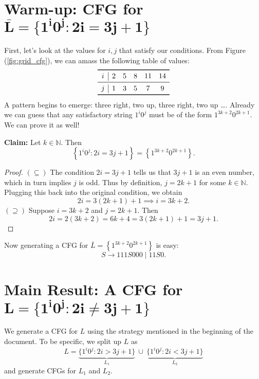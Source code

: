 \documentclass{article}
\begin{document}
\section*{Warm-up: CFG for $\bm{\bar{L}} = \bm{\{1^{i}0^{j} : 2i = 3j + 1\}}$}
    First, let's look at the values for $i, j$ that satisfy our conditions. From Figure (\ref{fig:grid_cfg}), we can amass the following table of values:
    $$\begin{array}{c|ccccc}
        \toprule
        i & 2 & 5 & 8 & 11 & 14 \\
        \midrule
        j & 1 & 3 & 5 & 7 & 9 \\
        \bottomrule
    \end{array}$$
    A pattern begins to emerge: three right, two up, three right, two up \dots. Already we can guess that any satisfactory string $1^{i}0^{j}$ must be of the form $1^{3k + 2}0^{2k + 1}$. We can prove it as well!

    \vspace{2mm}
    \textbf{Claim:} Let $k \in \mathbb{N}$. Then $$\left\{1^{i}0^{j} : 2i = 3j + 1\right\} = \left\{1^{3k + 2}0^{2k + 1}\right\}.$$
    \begin{proof}
        $(\subseteq)$ The condition $2i = 3j + 1$ tells us that $3j + 1$ is an even number, which in turn implies $j$ is odd. Thus by definition, $j = 2k + 1$ for some $k \in \mathbb{N}$. Plugging this back into the original condition, we obtain $$2i = 3(2k + 1) + 1 \implies i = 3k + 2.$$
        $(\supseteq)$ Suppose $i = 3k + 2$ and $j = 2k + 1$. Then $$2i = 2(3k + 2) = 6k + 4 = 3(2k + 1) + 1 = 3j + 1.$$
    \end{proof}
    Now generating a CFG for $\bar{L} = \left\{1^{3k + 2}0^{2k + 1}\right\}$ is easy:
    $$S \rightarrow 111S000 \mid 11S0.$$

\section*{Main Result: A CFG for $\bm{L = \{1^{i}0^{j} : 2i \ne 3j + 1\}}$}
    We generate a CFG for $L$ using the strategy mentioned in the beginning of the document. To be specific, we split up $L$ as $$L = \underbrace{\{1^{i}0^{j} : 2i > 3j + 1\}}_{L_{1}} \ \cup \ \underbrace{\{1^{i}0^{j} : 2i < 3j + 1\}}_{L_{2}}$$ and generate CFGs for $L_{1}$ and $L_{2}$.
\end{document}
